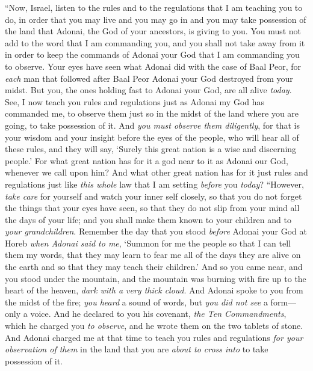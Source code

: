 \begin{biblechapter} %
 “Now, Israel, listen to the rules and to the regulations that I am teaching you to do, in order that you may live and you may go in and you may take possession of the land that Adonai, the God of your ancestors, is giving to you.
\verse You must not add to the word that I am commanding you, and you shall not take away from it in order to keep the commands of Adonai your God that I am commanding you to observe.
\verse Your eyes have seen what Adonai did with the case of Baal Peor, for \textit{each} man that followed after Baal Peor Adonai your God destroyed from your midst.
\verse But you, the ones holding fast to Adonai your God, are all alive \textit{today}.
\verse See, I now teach you rules and regulations just as Adonai my God has commanded me, to observe them just so in the midst of the land where you are going, to take possession of it.
\verse And \textit{you must observe them diligently}, for that is your wisdom and your insight before the eyes of the people, who will hear all of these rules, and they will say, ‘Surely this great nation is a wise and discerning people.’
\verse For what great nation has for it a god near to it as Adonai our God, whenever we call upon him?
\verse And what other great nation has for it just rules and regulations just like \textit{this whole} law that I am setting \textit{before} you \textit{today}?
\verse “However, \textit{take care} for yourself and watch your inner self closely, so that you do not forget the things that your eyes have seen, so that they do not slip from your mind all the days of your life; and you shall make them known to your children and to \textit{your grandchildren}.
\verse Remember the day that you stood \textit{before} Adonai your God at Horeb \textit{when Adonai said to me}, ‘Summon for me the people so that I can tell them my words, that they may learn to fear me all of the days they are alive on the earth and so that they may teach their children.’
\verse And so you came near, and you stood under the mountain, and the mountain was burning with fire up to the heart of the heaven, \textit{dark with a very thick cloud}.
\verse And Adonai spoke to you from the midst of the fire; \textit{you heard} a sound of words, but \textit{you did not see} a form—only a voice.
\verse And he declared to you his covenant, \textit{the Ten Commandments}, which he charged you \textit{to observe}, and he wrote them on the two tablets of stone.
\verse And Adonai charged me at that time to teach you rules and regulations \textit{for your observation of them} in the land that you are \textit{about to cross into} to take possession of it.

\end{biblechapter}
